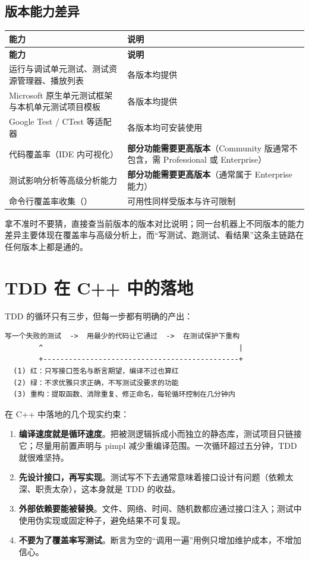 \subsection{版本能力差异}

\begin{longtable}{L{7.0cm}L{8.0cm}}
\toprule \textbf{能力} & \textbf{说明} \\ \midrule
\endfirsthead
\toprule \textbf{能力} & \textbf{说明} \\ \midrule
\endhead
\bottomrule \endlastfoot
运行与调试单元测试、测试资源管理器、播放列表 & 各版本均提供 \\
Microsoft 原生单元测试框架与本机单元测试项目模板 & 各版本均提供 \\
Google Test / CTest 等适配器 & 各版本均可安装使用 \\
代码覆盖率（IDE 内可视化） & \textbf{部分功能需要更高版本}（Community 版通常不包含，需 Professional 或 Enterprise） \\
测试影响分析等高级分析能力 & \textbf{部分功能需要更高版本}（通常属于 Enterprise 能力） \\
命令行覆盖率收集（） & 可用性同样受版本与许可限制 \\
\end{longtable}

\begin{tipbox}[提示]
拿不准时不要猜，直接查当前版本的版本对比说明；同一台机器上不同版本的能力差异主要体现在覆盖率与高级分析上，而“写测试、跑测试、看结果”这条主链路在任何版本上都是通的。
\end{tipbox}

\section{TDD 在 C++ 中的落地}

TDD 的循环只有三步，但每一步都有明确的产出：

\begin{lstlisting}[style=textstyle]
  写一个失败的测试  ->  用最少的代码让它通过  ->  在测试保护下重构
        ^                                              |
        +----------------------------------------------+
  (1) 红：只写接口签名与断言期望，编译不过也算红
  (2) 绿：不求优雅只求正确，不写测试没要求的功能
  (3) 重构：提取函数、消除重复、修正命名，每轮循环控制在几分钟内
\end{lstlisting}

在 C++ 中落地的几个现实约束：

\begin{enumerate}
  \item \textbf{编译速度就是循环速度}。把被测逻辑拆成小而独立的静态库，测试项目只链接它；尽量用前置声明与 pimpl 减少重编译范围。一次循环超过五分钟，TDD 就很难坚持。
  \item \textbf{先设计接口，再写实现}。测试写不下去通常意味着接口设计有问题（依赖太深、职责太杂），这本身就是 TDD 的收益。
  \item \textbf{外部依赖要能被替换}。文件、网络、时间、随机数都应通过接口注入；测试中使用伪实现或固定种子，避免结果不可复现。
  \item \textbf{不要为了覆盖率写测试}。断言为空的“调用一遍”用例只增加维护成本，不增加信心。
\end{enumerate}

